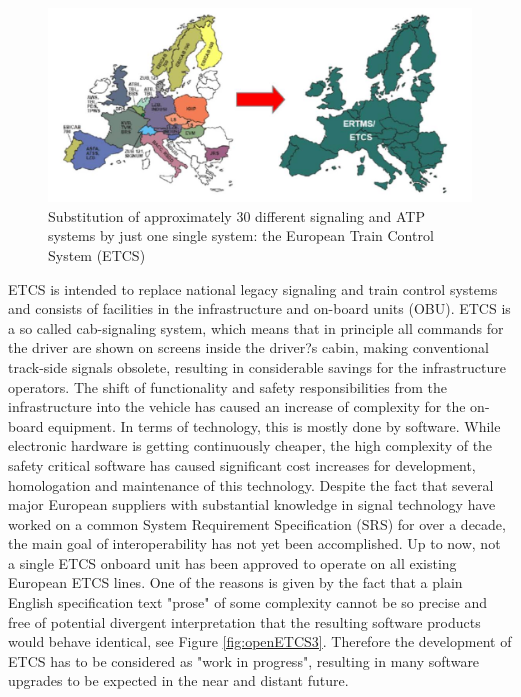 \documentclass{template/openetcs_report}
\begin{document}
\begin{figure}
\centering
\includegraphics[width=12cm]{openETCS2}
\caption{Substitution of approximately 30 different signaling and ATP systems by just one single system: the European Train Control System (ETCS)}
\label{fig:openETCS2}
\end{figure}

ETCS is intended to replace national legacy signaling and train control systems and consists of facilities in the infrastructure and on-board units (OBU). ETCS is a so called cab-signaling system, which means that in principle all commands for the driver are shown on screens inside the driver?s cabin, making conventional track-side signals obsolete, resulting in considerable savings for the infrastructure operators. The shift of functionality and safety responsibilities from the infrastructure into the vehicle has caused an increase of complexity for the on-board equipment. In terms of technology, this is mostly done by software. While electronic hardware is getting continuously cheaper, the high complexity of the safety critical software has caused significant cost increases for development, homologation and maintenance of this technology.
Despite the fact that several major European suppliers with substantial knowledge in signal technology have worked on a common System Requirement Specification (SRS) for over a decade, the main goal of interoperability has not yet been accomplished. Up to now, not a single ETCS onboard unit has been approved to operate on all existing European ETCS lines. One of the reasons is given by the fact that a plain English specification text "prose" of some complexity cannot be so precise and free of potential divergent interpretation that the resulting software products would behave identical, see Figure \ref{fig:openETCS3}. Therefore the development of ETCS has to be considered as "work in progress", resulting in many software upgrades to be expected in the near and distant future.
\end{document}

